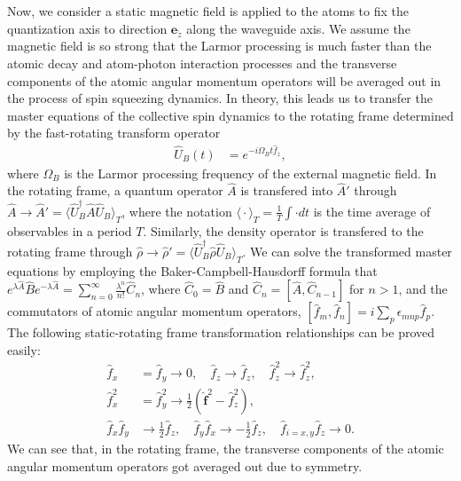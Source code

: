 \documentclass[pra,twocolumn,floatfix,superscriptaddress]{revtex4-1} %
\newcommand{\expect}[1]{\big\langle #1 \big\rangle}
\begin{document}
\begin{appendix}
Now, we consider a static magnetic field is applied to the atoms to fix the quantization axis to direction $ \mathbf{e}_{\tilde{z}} $ along the waveguide axis.
We assume the magnetic field is so strong that the Larmor processing is much faster than the atomic decay and atom-photon interaction processes and the transverse components of the atomic angular momentum operators will be averaged out in the process of spin squeezing dynamics.
In theory, this leads us to transfer the master equations of the collective spin dynamics to the rotating frame determined by the fast-rotating transform operator
\begin{align}
\hat{U}_B(t) &= e^{-i\Omega_Bt\hat{f}_z},
\end{align}
where $ \Omega_B $ is the Larmor processing frequency of the external magnetic field.
In the rotating frame, a quantum operator $ \hat{A} $ is transfered into $ \hat{A}' $ through $ \hat{A}\rightarrow \hat{A}'=\expect{\hat{U}_B^\dagger\hat{A}\hat{U}_B }_T $, where the notation $ \expect{\cdot}_T=\frac{1}{T}\int\cdot dt $ is the time average of observables in a period $ T $.
Similarly, the density operator is transfered to the rotating frame through $ \hat{\rho}\rightarrow \hat{\rho}'= \expect{\hat{U}_B^\dagger\hat{\rho}\hat{U}_B }_T $.
We can solve the transformed master equations by employing the Baker-Campbell-Hausdorff formula that $ e^{\lambda\hat{A}}\hat{B}e^{-\lambda\hat{A}}=\sum_{n=0}^\infty\frac{\lambda^n}{n!}\hat{C}_n $, where $ \hat{C}_0=\hat{B} $ and $ \hat{C}_n=\left[\hat{A},\hat{C}_{n-1} \right] $ for $ n>1 $, and the commutators of atomic angular momentum operators, $ \left[\hat{f}_m, \hat{f}_n\right]=i\sum_p\epsilon_{mnp}\hat{f}_p $.
The following static-rotating frame transformation relationships can be proved easily:
\begin{subequations}\label{eq:rotationtransf}
	\begin{align}
	\hat{f}_{x}&=\hat{f}_{y} \rightarrow 0, \quad \hat{f}_{z}\rightarrow\hat{f}_z, \quad \hat{f}_{z}^ 2\rightarrow\hat{f}_z^2,\\
	\hat{f}^2_{x} &= \hat{f}^ 2_{y} \rightarrow \frac{1}{2}(\hat{\mathbf{f}}^2-\hat{f}_z^2),\\
	\hat{f}_{x}\hat{f}_{y} &\rightarrow\frac{1}{2}\hat{f}_z,\quad \hat{f}_{y}\hat{f}_{x}\rightarrow -\frac{1}{2}\hat{f}_z,\quad \hat{f}_{i=x,y}\hat{f}_{z}\rightarrow 0.
	\end{align}
\end{subequations}
We can see that, in the rotating frame, the transverse components of the atomic angular momentum operators got averaged out due to symmetry.


\end{appendix}
\end{document}
